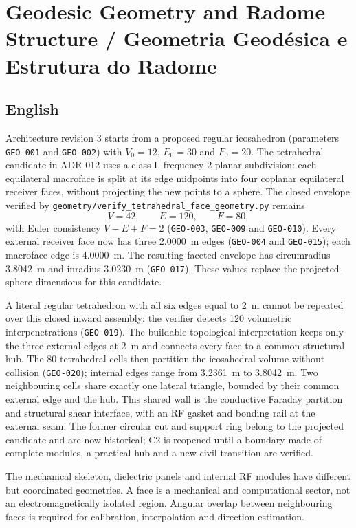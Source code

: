\chapter{Geodesic Geometry and Radome Structure / Geometria Geodésica e Estrutura do Radome}

\section*{English}
Architecture revision 3 starts from a proposed regular icosahedron (parameters \texttt{GEO-001} and \texttt{GEO-002}) with $V_0=12$, $E_0=30$ and $F_0=20$. The tetrahedral candidate in ADR-012 uses a class-I, frequency-2 planar subdivision: each equilateral macroface is split at its edge midpoints into four coplanar equilateral receiver faces, without projecting the new points to a sphere. The closed envelope verified by \texttt{geometry/verify\_tetrahedral\_face\_geometry.py} remains
\[
V=42,\qquad E=120,\qquad F=80,
\]
with Euler consistency $V-E+F=2$ (\texttt{GEO-003}, \texttt{GEO-009} and \texttt{GEO-010}). Every external receiver face now has three \SI{2.0000}{m} edges (\texttt{GEO-004} and \texttt{GEO-015}); each macroface edge is \SI{4.0000}{m}. The resulting faceted envelope has circumradius \SI{3.8042}{m} and inradius \SI{3.0230}{m} (\texttt{GEO-017}). These values replace the projected-sphere dimensions for this candidate.

A literal regular tetrahedron with all six edges equal to \SI{2}{m} cannot be repeated over this closed inward assembly: the verifier detects 120 volumetric interpenetrations (\texttt{GEO-019}). The buildable topological interpretation keeps only the three external edges at \SI{2}{m} and connects every face to a common structural hub. The 80 tetrahedral cells then partition the icosahedral volume without collision (\texttt{GEO-020}); internal edges range from \SI{3.2361}{m} to \SI{3.8042}{m}. Two neighbouring cells share exactly one lateral triangle, bounded by their common external edge and the hub. This shared wall is the conductive Faraday partition and structural shear interface, with an RF gasket and bonding rail at the external seam. The former circular cut and support ring belong to the projected candidate and are now historical; C2 is reopened until a boundary made of complete modules, a practical hub and a new civil transition are verified.

The mechanical skeleton, dielectric panels and internal RF modules have different but coordinated geometries. A face is a mechanical and computational sector, not an electromagnetically isolated region. Angular overlap between neighbouring faces is required for calibration, interpolation and direction estimation.

